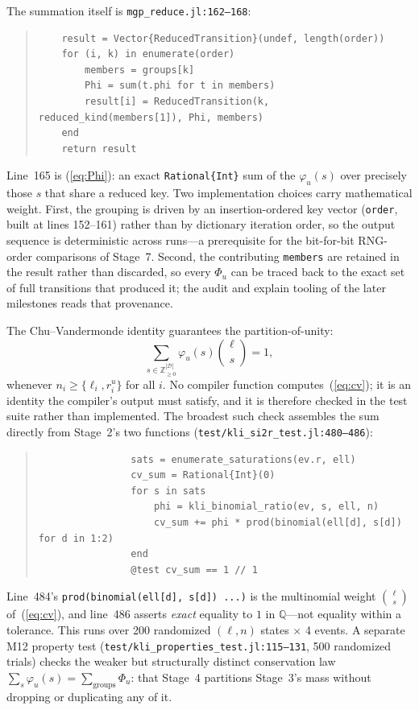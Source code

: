 \documentclass[11pt,leqno]{article}
\newcommand{\Demes}{\mathcal{D}}    %
\newcommand{\Zp}{\mathbb{Z}_{\ge 0}}
\newcommand{\code}[1]{\texttt{#1}}
\theoremstyle{plain}
\theoremstyle{definition}
\begin{document}
The summation itself is \code{mgp\_reduce.jl:162--168}:
\begin{quote}
{\small
\begin{verbatim}
    result = Vector{ReducedTransition}(undef, length(order))
    for (i, k) in enumerate(order)
        members = groups[k]
        Phi = sum(t.phi for t in members)
        result[i] = ReducedTransition(k, reduced_kind(members[1]), Phi, members)
    end
    return result
\end{verbatim}
}
\end{quote}
Line~165 is (\ref{eq:Phi}): an exact \code{Rational\{Int\}} sum of the
$\varphi_u(s)$ over precisely those $s$ that share a reduced key.  Two
implementation choices carry mathematical weight.  First, the grouping is
driven by an insertion-ordered key vector (\code{order}, built at lines
152--161) rather than by dictionary iteration order, so the output sequence is
deterministic across runs---a prerequisite for the bit-for-bit RNG-order
comparisons of Stage~7.  Second, the contributing \code{members} are retained
in the result rather than discarded, so every $\Phi_u$ can be traced back to
the exact set of full transitions that produced it; the audit and explain
tooling of the later milestones reads that provenance.

The Chu--Vandermonde identity guarantees the partition-of-unity:
\begin{equation}\label{eq:cv}
  \sum_{s \in \Zp^{|\Demes|}}
  \varphi_u(s) \binom{\ell}{s} = 1,
\end{equation}
whenever $n_i \ge \{\ell_i, r^u_i\}$ for all $i$.  No compiler function
computes~(\ref{eq:cv}); it is an identity the compiler's output must satisfy,
and it is therefore checked in the test suite rather than implemented.  The
broadest such check assembles the sum directly from Stage~2's two functions
(\code{test/kli\_si2r\_test.jl:480--486}):
\begin{quote}
{\small
\begin{verbatim}
                sats = enumerate_saturations(ev.r, ell)
                cv_sum = Rational{Int}(0)
                for s in sats
                    phi = kli_binomial_ratio(ev, s, ell, n)
                    cv_sum += phi * prod(binomial(ell[d], s[d]) for d in 1:2)
                end
                @test cv_sum == 1 // 1
\end{verbatim}
}
\end{quote}
Line~484's \code{prod(binomial(ell[d], s[d]) ...)} is the multinomial weight
$\binom{\ell}{s}$ of~(\ref{eq:cv}), and line~486 asserts \emph{exact} equality
to $1$ in $\mathbb{Q}$---not equality within a tolerance.  This runs over 200
randomized $(\ell,n)$ states $\times$ 4 events.  A separate M12 property test
(\code{test/kli\_properties\_test.jl:115--131}, 500 randomized trials) checks
the weaker but structurally distinct conservation law $\sum_s \varphi_u(s) =
\sum_{\text{groups}} \Phi_u$: that Stage~4 partitions Stage~3's mass without
dropping or duplicating any of it.
\end{document}
